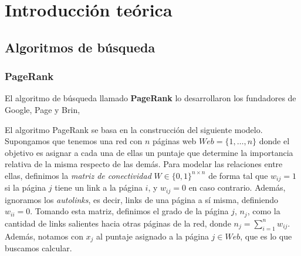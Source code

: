 \section{Introducci\'on te\'orica}

\subsection{Algoritmos de búsqueda}

\subsubsection{PageRank}

El algoritmo de búsqueda llamado \textbf{PageRank} lo desarrollaron los fundadores de Google, Page y Brin, 

El algoritmo PageRank se basa en la construcci\'on del siguiente modelo. Supongamos que tenemos una red con $n$ p\'aginas 
web $Web = \{1,\dots,n\}$ donde
el objetivo es asignar a cada una de ellas un puntaje que determine la importancia relativa de la misma respecto de las
dem\'as. Para modelar las relaciones entre ellas, definimos la \emph{matriz de conectividad} $W \in \{0,1\}^{n \times n}$ 
de forma tal que $w_{ij} = 1$ si la p\'agina $j$ tiene un link a la p\'agina $i$, y $w_{ij} = 0$ en caso contrario. 
Adem\'as, ignoramos los \emph{autolinks}, es decir, links de una p\'agina a s\'i misma, definiendo $w_{ii} = 0$. Tomando 
esta matriz, definimos el grado de la p\'agina $j$, $n_j$, como la cantidad de links salientes hacia otras p\'aginas 
de la red, donde $n_j = \sum_{i = 1}^n w_{ij}$. Adem\'as, notamos con $x_j$ al puntaje asignado a la p\'agina $j\in
Web$, que es lo que buscamos calcular.

